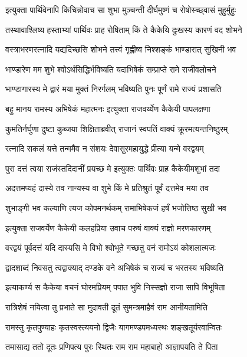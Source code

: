 \twolineshloka
{इत्युक्ता पार्थिवेनापि किचिन्नोवाच सा शुभा}
{मुञ्चन्ती दीर्घमुष्णं च रोषोस्च्छ्वासं मुहुर्मुहुः} %

\twolineshloka
{तस्थावाश्लिष्य हस्ताभ्यां पार्थिवः प्राह रोषिताम्}
{किं ते कैकेयि दुःखस्य कारणं वद शोभने} %

\twolineshloka
{वस्त्राभरणरत्नादि यद्यदिच्छसि शोभने}
{तत्त्वं गृह्णीष्व निश्शङ्कं भाण्डारात् सुखिनी भव} %

\twolineshloka
{भाण्डारेण मम शुभे श्वोऽर्थसिद्धिर्भविष्यति}
{यदाभिषेकं सम्प्राप्ते रामे राजीवलोचने} %

\twolineshloka
{भाण्डागारस्य मे द्वारं मया मुक्तं निरर्गलम्}
{भविष्यति पुनः पूर्णं रामे राज्यं प्रशासति} %

\twolineshloka
{बहु मानय रामस्य अभिषेकं महात्मनः}
{इत्युक्ता राजवर्य्येण कैकेयी पापलक्षणा} %

\twolineshloka
{कुमतिर्नर्घुणा दुष्टा कुब्जया शिक्षिताब्रवीत्}
{राजानं स्वपतिं वाक्यं क्रूरमत्यन्तनिष्ठुरम्} %

\twolineshloka
{रत्नादि सकलं यत्ते तन्ममैव न संशयः}
{देवासुरमहायुद्धे प्रीत्या यन्मे वरद्वयम्} %

\twolineshloka
{पुरा दत्तं त्वया राजंस्तदिदानीं प्रयच्छ मे}
{इत्युक्तः पार्थिवः प्राह कैकेयीमशुभां तदा} %

\twolineshloka
{अदत्तमप्यहं दास्ये तव नान्यस्य वा शुभे}
{किं मे प्रतिश्रुतं पूर्वं दत्तमेव मया तव} %

\twolineshloka
{शुभाङ्गी भव कल्याणि त्यज कोपमनर्थकम्}
{रामाभिषेकजं हर्षं भजोत्तिष्ठ सुखी भव} %

\twolineshloka
{इत्युक्ता राजवर्येण कैकेयी कलहप्रिया}
{उवाच परुषं वाक्यं राज्ञो मरणकारणम्} %

\twolineshloka
{वरद्वयं पूर्वदत्तं यदि दास्यसि मे विभो}
{श्वोभूते गच्छतु वनं रामोऽयं कोशलात्मजः} %

\twolineshloka
{द्वादशाब्दं निवसतु त्वद्वाक्याद् दण्डके वने}
{अभिषेकं च राज्यं च भरतस्य भविष्यति} %

\twolineshloka
{इत्याकर्ण्य स कैकेया वचनं घोरमप्रियम्}
{पपात भुवि निस्सज्ञो राजा सापि विभूषिता} %

\twolineshloka
{रात्रिशेषं नयित्वा तु प्रभाते सा मुदावती}
{दूतं सुमन्त्रमाहैवं राम आनीयतामिति} %

\twolineshloka
{रामस्तु कृतपुण्याहः कृतस्वस्त्ययनो द्विजैः}
{यागमण्डपमध्यस्थः शङ्खतूर्यरवान्वितः} %

\twolineshloka
{तमासाद्य ततो दूतः प्रणिपत्य पुरः स्थितः}
{राम राम महाबाहो आज्ञापयति ते पिता} %


